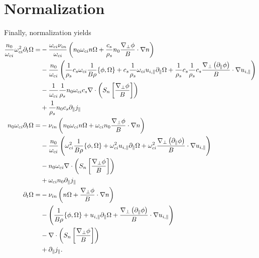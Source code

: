 \section{Normalization}
Finally, normalization yields
%
\begin{align*}
 \frac{n_0}{\omega_{ci}}\omega_{ci}^2\partial_t\Omega
 =&
 - \frac{\omega_{ci}\nu_{in}}{\omega_{ci}}
 \left(n_0\omega_{ci}n\Omega
 + \frac{c_s}{\rho_s}n_0\frac{\nabla_\perp \phi}{B} \cdot \nabla n\right)
  \\
 &- \frac{n_0}{\omega_{ci}}
 \left(\frac{1}{\rho_s} c_s \omega_{ci}\frac{1}{B\rho}\{\phi, \Omega\}
    + c_s \frac{1}{\rho_s}\omega_{ci}u_{i,\|}\partial_\|\Omega
    + \frac{1}{\rho_s}c_s\frac{1}{\rho_s}c_s
    \frac{\nabla_\perp\left( \partial_\|\phi\right)}{B}\cdot\nabla u_{i,\|}
 \right)
 \\
 &
 - \frac{1}{\omega_{ci}}\frac{1}{\rho_s}n_0\omega_{ci}c_s
    \nabla\cdot \left( S_n \left[ \frac{ \nabla_\perp \phi }{ B } \right] \right)
 \\
 &
 + \frac{1}{\rho_s}n_0c_s\partial_\| j_\|
 \\
 n_0\omega_{ci}\partial_t\Omega
 =&
 - \nu_{in}
 \left(n_0\omega_{ci}n\Omega
 + \omega_{ci}n_0\frac{\nabla_\perp \phi}{B} \cdot \nabla n\right)
  \\
 &- \frac{n_0}{\omega_{ci}}
 \left(\omega_{ci}^2\frac{1}{B\rho}\{\phi, \Omega\}
    + \omega_{ci}^2u_{i,\|}\partial_\|\Omega
    + \omega_{ci}^2
    \frac{\nabla_\perp\left( \partial_\|\phi\right)}{B}\cdot\nabla u_{i,\|}
 \right)
 \\
 &
 - n_0\omega_{ci}
    \nabla\cdot \left( S_n \left[ \frac{ \nabla_\perp \phi }{ B } \right] \right)
 \\
 &
 + \omega_{ci}n_0\partial_\| j_\|
 \\
 \partial_t\Omega
 =&
 - \nu_{in}
 \left(n\Omega
 + \frac{\nabla_\perp \phi}{B} \cdot \nabla n\right)
  \\
 &-
 \left(\frac{1}{B\rho}\{\phi, \Omega\}
    + u_{i,\|}\partial_\|\Omega
    +\frac{\nabla_\perp\left( \partial_\|\phi\right)}{B}\cdot\nabla u_{i,\|}
 \right)
 \\
 &
 - \nabla\cdot \left( S_n \left[ \frac{ \nabla_\perp \phi }{ B } \right] \right)
 \\
 &
 + \partial_\| j_\|.
\end{align*}

